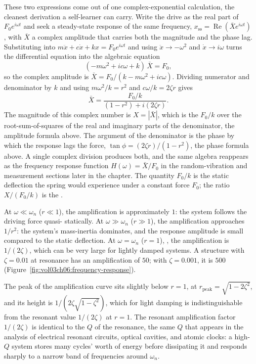 These two expressions come out of one complex-exponential calculation,
the cleanest derivation a self-learner can carry. Write the drive as the
real part of $F_0 e^{i\omega t}$ and seek a steady-state response of the
same frequency, $x_{\text{ss}} = \operatorname{Re}(\bar{X} e^{i\omega
t})$, with $\bar{X}$ a complex amplitude that carries both the magnitude
and the phase lag. Substituting into $m\ddot{x} + c\dot{x} + kx = F_0
e^{i\omega t}$ and using $\ddot{x} \to -\omega^2$ and $\dot{x} \to
i\omega$ turns the differential equation into the algebraic equation
\[
(-m\omega^2 + ic\omega + k)\,\bar{X} = F_0,
\]
so the complex amplitude is $\bar{X} = F_0 / (k - m\omega^2 + ic\omega)$.
Dividing numerator and denominator by $k$ and using $m\omega^2/k = r^2$
and $c\omega/k = 2\zeta r$ gives
\[
\bar{X} = \frac{F_0/k}{(1 - r^2) + i(2\zeta r)}.
\]
The magnitude of this complex number is $X = |\bar{X}|$, which is the
$F_0/k$ over the root-sum-of-squares of the real and imaginary parts of
the denominator, the amplitude formula above. The argument of the
denominator is the phase by which the response lags the force,
$\tan\phi = (2\zeta r)/(1 - r^2)$, the phase formula above. A single
complex division produces both, and the same algebra reappears as the
frequency response function $H(\omega) = \bar{X}/F_0$ in the
random-vibration and measurement sections later in the chapter. The
quantity $F_0/k$ is the static deflection the spring would
experience under a constant force $F_0$; the ratio $X/(F_0/k)$ is
the .

At $\omega \ll \omega_n$ ($r \ll 1$), the amplification is
approximately $1$: the system follows the driving force quasi-
statically. At $\omega \gg \omega_n$ ($r \gg 1$), the amplification
approaches $1/r^2$: the system's mass-inertia dominates, and the
response amplitude is small compared to the static deflection. At
$\omega = \omega_n$ ($r = 1$), , the amplification
is $1/(2\zeta)$, which can be very large for lightly damped systems.
A structure with $\zeta = 0.01$ at resonance has an amplification of
$50$; with $\zeta = 0.001$, it is $500$
(Figure~\ref{fig:vol03ch06:frequency-response}).



The peak of the amplification curve sits slightly below $r = 1$, at
$r_{\text{peak}} = \sqrt{1 - 2\zeta^2}$, and its height is
$1/(2\zeta\sqrt{1-\zeta^2})$, which for light damping is
indistinguishable from the resonant value $1/(2\zeta)$ at $r = 1$.
The resonant amplification factor $1/(2\zeta)$ is identical to the
 $Q$ of the resonance, the same $Q$ that
appears in the analysis of electrical resonant circuits, optical
cavities, and atomic clocks: a high-$Q$ system stores many cycles'
worth of energy before dissipating it and responds sharply to a
narrow band of frequencies around $\omega_n$.


